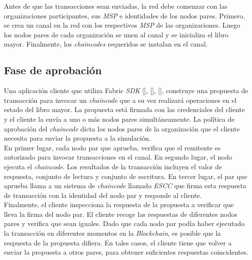 \vspace{1 cm}
Antes de que las transacciones sean enviadas, la red debe comenzar con las organizaciones participantes, sus \emph{MSP} e identidades de los nodos pares. Primero, se crea un canal en la red con los respectivos \emph{MSP} de las organizaciones. Luego los nodos pares de cada organizaci\'on se unen al canal y se inicializa el libro mayor. Finalmente, los \emph{chaincodes} requeridos se instalan en el canal.


\subsection{Fase de aprobaci\'on}
Una aplicaci\'on cliente que utiliza Fabric \emph{SDK} [\cite{Go-SDK}], [\cite{Node-SDK}], [\cite{Java-SDK}], construye una propuesta de transacci\'on para invocar un \emph{chaincode} que a su vez realizar\'a operaciones en el estado del libro mayor. La propuesta est\'a firmada con las credenciales del cliente y el cliente la env\'ia a uno o m\'as nodos pares simult\'aneamente. La pol\'itica de aprobaci\'on del \emph{chaincode} dicta los nodos pares de la organizaci\'on que el cliente necesita para enviar la propuesta a la simulaci\'on.\\

En primer lugar, cada nodo par que aprueba, verifica que el remitente es autorizado para invocar transacciones en el canal. En segundo lugar, el nodo ejecuta el \emph{chaincode}. Los resultados de la transacci\'on incluyen el valor de respuesta, conjunto de lectura y conjunto de escritura. En tercer lugar, el par que aprueba llama a un sistema de \emph{chaincode} llamado \emph{ESCC} que firma esta respuesta de transacci\'on con la identidad del nodo par y responde al cliente.\\

Finalmente, el cliente inspecciona la respuesta de la propuesta a verificar que lleva la firma del nodo par. El cliente recoge las respuestas de diferentes nodos pares y verifica que sean iguales. Dado que cada nodo par pod\'ia haber ejecutado la transacci\'on en diferentes momentos en la \emph{Blockchain}, es posible que la respuesta de la propuesta difiera. En tales casos, el cliente tiene que volver a enviar la propuesta a otros pares, para obtener suficientes respuestas coincidentes.

